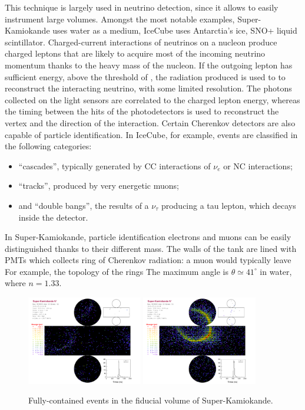 This technique is largely used in neutrino detection, since it allows to easily instrument large volumes.
Amongst the most notable examples, Super-Kamiokande uses water as a medium, IceCube uses Antarctia's ice, %
SNO+ liquid scintillator. 
Charged-current interactions of neutrinos on a nucleon produce charged leptons %
that are likely to acquire most of the incoming neutrino momentum thanks to the heavy mass of the nucleon.
If the outgoing lepton has sufficient energy, above the threshold of , %
the radiation produced is used to to reconstruct the interacting neutrino, with some limited resolution.
The photons collected on the light sensors are correlated to the charged lepton energy, %
whereas the timing between the hits of the photodetectors is used to reconstruct the vertex and the direction %
of the interaction.
Certain Cherenkov detectors are also capable of particle identification.
In IceCube, for example, events are classified in the following categories:
\begin{itemize}
	\item ``cascades'', typically generated by CC interactions of $\nu_e$ or NC interactions;
	\item ``tracks'', produced by very energetic muons;
	\item and ``double bangs'', the results of a $\nu_\tau$ producing a tau lepton, which decays inside the detector.
\end{itemize}
In Super-Kamiokande, particle identification electrons and muons can be easily distinguished thanks to their different mass.
The walls of the tank are lined with PMTs which collects ring of Cherenkov radiation: %
a muon would typically leave
For example, the topology of the rings
The maximum angle is $\theta \simeq 41^\circ$ in water, where $n = 1.33$.

\begin{figure}
	\centering
	\includegraphics[width=0.45\textwidth]{Electron.pdf}
	\includegraphics[width=0.45\textwidth]{Muon.pdf}
	\caption{Fully-contained events in the fiducial volume of Super-Kamiokande.}
	\label{fig:sk_events}
\end{figure}

